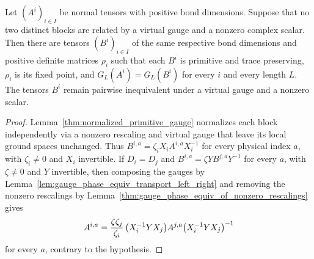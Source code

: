 \begin{lemma}
    \label{thm:normal_blocks_primitive_representatives}
    \leanok
    Let $(A^i)_{i\in I}$ be normal tensors with positive bond dimensions.
    Suppose that no two distinct blocks are related by a virtual gauge
    and a nonzero complex scalar. Then there are tensors $(B^i)_{i\in I}$
    of the same respective bond dimensions and positive definite matrices
    $\rho_i$ such that each $B^i$ is primitive and trace preserving,
    $\rho_i$ is its fixed point, and $G_L(A^i)=G_L(B^i)$ for every
    $i$ and every length $L$. The tensors $B^i$ remain pairwise inequivalent
    under a virtual gauge and a nonzero scalar.
\end{lemma}
\begin{proof}
    \leanok
    Lemma~\ref{thm:normalized_primitive_gauge} normalizes each block
    independently via a nonzero rescaling and virtual gauge that leave its local
    ground spaces unchanged. Thus $B^{i,a}=\zeta_iX_iA^{i,a}X_i^{-1}$ for every
    physical index $a$, with $\zeta_i\ne0$ and $X_i$ invertible. If $D_i=D_j$
    and $B^{i,a}=\zeta YB^{j,a}Y^{-1}$ for every $a$, with $\zeta\ne0$ and $Y$
    invertible, then composing the gauges by
    Lemma~\ref{lem:gauge_phase_equiv_transport_left_right} and removing the
    nonzero rescalings by
    Lemma~\ref{thm:gauge_phase_equiv_of_nonzero_rescalings} gives
    \begin{align}
        A^{i,a}=\frac{\zeta\zeta_j}{\zeta_i}\,
        \bigl(X_i^{-1}YX_j\bigr)A^{j,a}\bigl(X_i^{-1}YX_j\bigr)^{-1}
        \notag
    \end{align}
    for every $a$, contrary to the hypothesis.
\end{proof}

